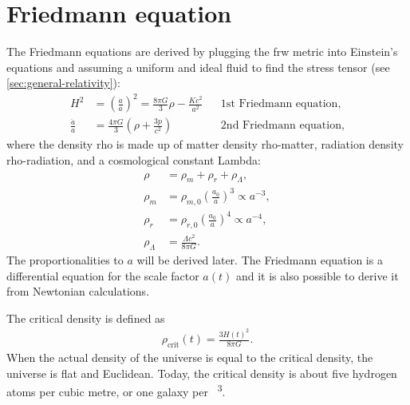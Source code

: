 \section{Friedmann equation}
\label{sec:Friedmann}

The Friedmann equations are derived by plugging the \ac{frw} metric into Einstein's equations and assuming a uniform and ideal fluid to find the stress tensor (see \cref{sec:general-relativity}):
\begin{align*}
	H^2 &= \left( \frac{\dot{a}}{a} \right)^2 = \frac{8 \pi G}{3} \rho - \frac{K c^2}{a^2} && \text{1st Friedmann equation,}\\
	\frac{\ddot{a}}{a} &= \frac{4 \pi G}{3} \left( \rho + \frac{3 p}{c^2} \right) && \text{2nd Friedmann equation,}
\end{align*}
where the density \gls{rho} is made up of matter density \gls{rho-matter}, radiation density \gls{rho-radiation}, and a cosmological constant \gls{Lambda}:
\begin{align*}
	\rho &= \rho_m + \rho_r + \rho_{\Lambda},\\
	\rho_m &= \rho_{m,0} \left( \frac{a_0}{a} \right)^3 \propto a^{-3},\\
	\rho_r &= \rho_{r,0} \left( \frac{a_0}{a} \right)^4 \propto a^{-4},\\
	\rho_{\Lambda} &= \frac{\Lambda c^2}{8 \pi G}.
\end{align*}
The proportionalities to $a$ will be derived later.
The Friedmann equation is a differential equation for the scale factor $a(t)$ and it is also possible to derive it from Newtonian calculations.

The critical density is defined as
\begin{align*}
	\rho_\text{crit}(t) = \frac{3 H(t)^2}{8 \pi G}.
\end{align*}
When the actual density of the universe is equal to the critical density, the universe is flat and Euclidean.
Today, the critical density is about five hydrogen atoms per cubic metre, or one galaxy per \si{\mega\parsec\cubed}.

